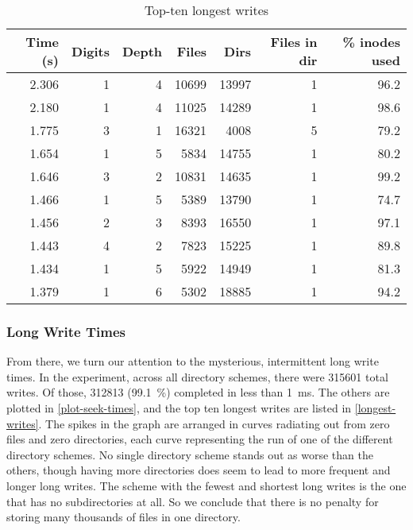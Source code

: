 \begin{table}[p]
    \caption{Top-ten longest writes}
    \label{longest-writes}
    \begin{tabular}{r r r r r r r}
        Time (\si{\s}) & Digits & Depth & Files & Dirs & Files in dir & \% inodes used \\
        \midrule
2.306 & 1 & 4 & 10699 & 13997 &  1 & 96.2 \\
2.180 & 1 & 4 & 11025 & 14289 &  1 & 98.6 \\
1.775 & 3 & 1 & 16321 &  4008 &  5 & 79.2 \\
1.654 & 1 & 5 &  5834 & 14755 &  1 & 80.2 \\
1.646 & 3 & 2 & 10831 & 14635 &  1 & 99.2 \\
1.466 & 1 & 5 &  5389 & 13790 &  1 & 74.7 \\
1.456 & 2 & 3 &  8393 & 16550 &  1 & 97.1 \\
1.443 & 4 & 2 &  7823 & 15225 &  1 & 89.8 \\
1.434 & 1 & 5 &  5922 & 14949 &  1 & 81.3 \\
1.379 & 1 & 6 &  5302 & 18885 &  1 & 94.2 \\
    \end{tabular}
\end{table}

\subsubsection{Long Write Times}

From there, we turn our attention to the mysterious, intermittent long write
times. In the experiment, across all directory schemes, there were \num{315601}
total writes. Of those, \num{312813} (\SI{99.1}{\percent}) completed in less
than \SI{1}{\ms}. The others are plotted in \autoref{plot-seek-times}, and the
top ten longest writes are listed in \autoref{longest-writes}. The spikes in the
graph are arranged in curves radiating out from zero files and zero directories,
each curve representing the run of one of the different directory schemes. No
single directory scheme stands out as worse than the others, though having more
directories does seem to lead to more frequent and longer long writes. The
scheme with the fewest and shortest long writes is the one that has no
subdirectories at all. So we conclude that there is no penalty for storing many
thousands of files in one directory.

